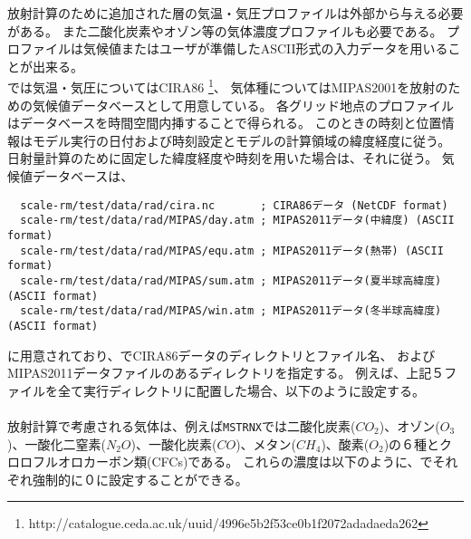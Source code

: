 放射計算のために追加された層の気温・気圧プロファイルは外部から与える必要がある。
また二酸化炭素やオゾン等の気体濃度プロファイルも必要である。
プロファイルは気候値またはユーザが準備したASCII形式の入力データを用いることが出来る。\\

\scalerm では気温・気圧についてはCIRA86
\footnote{http://catalogue.ceda.ac.uk/uuid/4996e5b2f53ce0b1f2072adadaeda262}\citep{CSR_2006}、
気体種についてはMIPAS2001\citep{Remedios_2007}を放射のための気候値データベースとして用意している。
各グリッド地点のプロファイルはデータベースを時間空間内挿することで得られる。
このときの時刻と位置情報はモデル実行の日付および時刻設定とモデルの計算領域の緯度経度に従う。
日射量計算のために固定した緯度経度や時刻を用いた場合は、それに従う。
気候値データベースは、
\begin{verbatim}
  scale-rm/test/data/rad/cira.nc       ; CIRA86データ (NetCDF format)
  scale-rm/test/data/rad/MIPAS/day.atm ; MIPAS2011データ(中緯度) (ASCII format)
  scale-rm/test/data/rad/MIPAS/equ.atm ; MIPAS2011データ(熱帯) (ASCII format)
  scale-rm/test/data/rad/MIPAS/sum.atm ; MIPAS2011データ(夏半球高緯度) (ASCII format)
  scale-rm/test/data/rad/MIPAS/win.atm ; MIPAS2011データ(冬半球高緯度) (ASCII format)
\end{verbatim}
に用意されており、でCIRA86データのディレクトリとファイル名、
およびMIPAS2011データファイルのあるディレクトリを指定する。
例えば、上記５ファイルを全て実行ディレクトリに配置した場合、以下のように設定する。\\

\\

放射計算で考慮される気体は、例えば\verb|MSTRNX|では二酸化炭素($CO_{2}$)、オゾン($O_{3}$)、一酸化二窒素($N_{2}O$)、一酸化炭素($CO$)、メタン($CH_{4}$)、酸素($O_{2}$)の６種とクロロフルオロカーボン類(CFCs)である。
これらの濃度は以下のように、でそれぞれ強制的に０に設定することができる。\\

